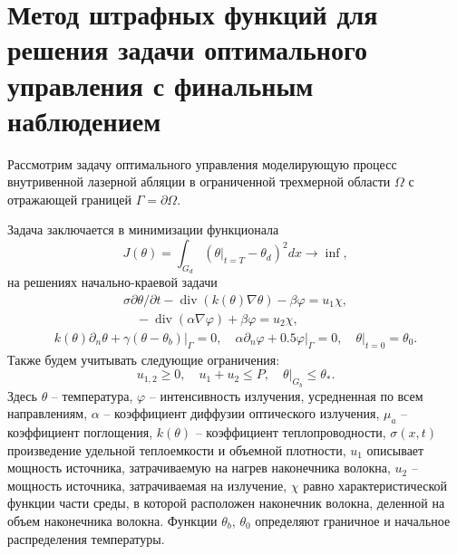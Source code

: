 \section{Метод штрафных функций для решения задачи
оптимального управления с финальным наблюдением}
\label{sec:ch3:sec3}

%
%
Рассмотрим задачу оптимального управления моделирующую процесс
внутривенной лазерной абляции в ограниченной трехмерной области
$\Omega$ с отражающей границей $\Gamma=\partial\Omega$.

Задача заключается в минимизации функционала
\[
    J(\theta)=\int_{G_{d}}\left(\left.\theta\right|_{t=T}
    -\theta_{d}\right)^{2} d x \rightarrow \inf,
\]
на решениях начально-краевой задачи
\begin{gather}
    \label{eq:3_3:1}
    \sigma \partial \theta / \partial t-\operatorname{div}(k(\theta) \nabla \theta)
    -\beta \varphi=u_{1} \chi, \\
    \quad-\operatorname{div}(\alpha \nabla \varphi)+\beta \varphi= u_{2} \chi,
\end{gather}
\begin{gather}
    \label{eq:3_3:2}
    k(\theta) \partial_{n} \theta+\left.\gamma
    \left(\theta-\theta_{b}\right)\right|_{\Gamma}=0,
    \quad \alpha \partial_{n} \varphi +
    \left.0.5 \varphi\right|_{\Gamma}=0,\left.\quad \theta\right|_{t=0}=\theta_{0}.
\end{gather}
Также будем учитывать следующие ограничения:
\[
    u_{1,2} \geq 0, \quad u_{1}+u_{2} \leq P,\left.\quad \theta\right|_{G_{b}} \leq \theta_{*}.
\]
Здесь $\theta$ --  температура, $\varphi$ --  интенсивность излучения, усредненная по всем направлениям,
$\alpha$ --  коэффициент диффузии оптического излучения, $\mu_{a}$ --  коэффициент поглощения,
$k(\theta)$ --  коэффициент теплопроводности, $\sigma(x, t)$ произведение удельной теплоемкости
и объемной плотности, $u_{1}$ описывает мощность источника, затрачиваемую
на нагрев наконечника волокна, $u_{2}$ --  мощность источника, затрачиваемая на излучение,
$\chi$ равно характеристической функции части среды, в которой расположен наконечник волокна,
деленной на объем наконечника волокна.
Функции $\theta_{b}$, $\theta_{0}$ определяют граничное и начальное распределения температуры.

